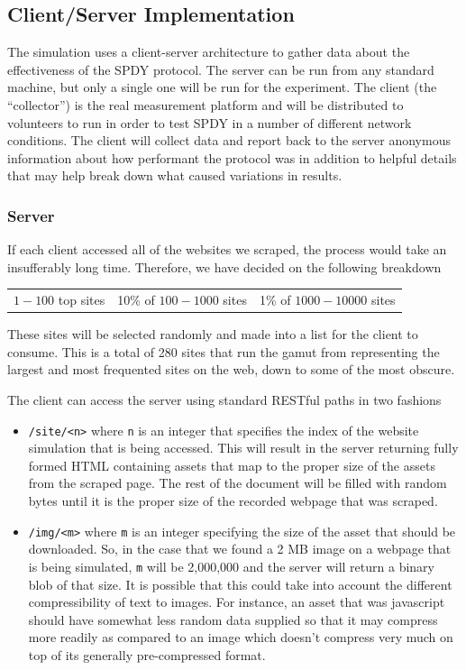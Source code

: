 \documentclass[11pt,letterpaper,notitlepage]{article}
\begin{document}
\subsection{Client/Server Implementation}
\label{sec:research/client-server}
The simulation uses a client-server architecture to gather data about the
effectiveness of the SPDY protocol. The server can be run from any standard
machine, but only a single one will be run for the experiment.  The client (the
``collector'') is the real measurement platform and will be distributed to
volunteers to run in order to test SPDY in a number of different network
conditions.  The client will collect data and report back to the server
anonymous information about how performant the protocol was in addition to
helpful details that may help break down what caused variations in results.
\subsubsection{Server}
\label{sec:research/server}
If each client accessed all of the websites we scraped, the process would take
an insufferably long time.  Therefore, we have decided on the following
breakdown
\begin{center}
\begin{tabular}{ccc}
$1-100$ top sites & 10\% of $100-1000$ sites & 1\% of $1000-10000$ sites \\
\end{tabular}
\end{center}

These sites will be selected randomly and made into a list for the client to
consume. This is a total of 280 sites that run the gamut from representing the
largest and most frequented sites on the web, down to some of the most obscure.

The client can access the server using standard RESTful paths in two fashions
\begin{itemize}
\item \texttt{/site/<n>} where \texttt{n} is an integer that specifies the index
of the website simulation that is being accessed.  This will result in the
server returning fully formed HTML containing assets that map to the proper size
of the assets from the scraped page.  The rest of the document will be filled
with random bytes until it is the proper size of the recorded webpage that was
scraped.
\item \texttt{/img/<m>} where \texttt{m} is an integer specifying the size of the
asset that should be downloaded. So, in the case that we found a 2 MB image on a
webpage that is being simulated, \texttt{m} will be 2,000,000 and the server
will return a binary blob of that size. It is possible that this could take into
account the different compressibility of text to images.  For instance, an asset
that was javascript should have somewhat less random data supplied so that it
may compress more readily as compared to an image which doesn't compress very
much on top of its generally pre-compressed format.
\end{itemize}
\end{document}
